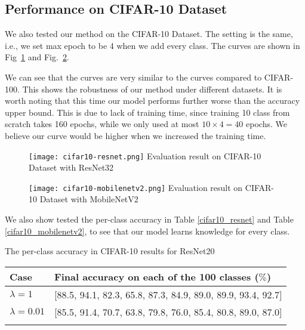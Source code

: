 \subsection{Performance on CIFAR-10 Dataset}
We also tested our method on the CIFAR-10 Dataset. The setting is the same, i.e., we set max epoch to be 4 when we add every class. The curves are shown in Fig~\ref{fig:cifar10-resnet} and Fig.~\ref{fig:cifar10-mobilenetv2}.



We can see that the curves are very similar to the curves compared to CIFAR-100. This shows the robustness of our method under different datasets. It is worth noting that this time our model performs further worse than the accuracy upper bound. This is due to lack of training time, since training 10 class from scratch takes 160 epochs, while we only used at most $10 \times 4 = 40$ epochs. We believe our curve would be higher when we increased the training time.
\begin{figure}[!htp]
	\centering
	\texttt{[image: cifar10-resnet.png]}
	{Evaluation result on CIFAR-10 Dataset with ResNet32}
	\label{fig:cifar10-resnet}
\end{figure}
\begin{figure}[!htp]
	\centering
	\texttt{[image: cifar10-mobilenetv2.png]}
	{Evaluation result on CIFAR-10 Dataset with MobileNetV2}
	\label{fig:cifar10-mobilenetv2}
\end{figure}
We also show tested the per-class accuracy in Table \ref{cifar10_resnet} and Table \ref{cifar10_mobilenetv2}, to see that our model learns knowledge for every class.
\begin{table}[!hpb]
	\centering
	{The per-class accuracy in CIFAR-10 results for ResNet20}
	\label{tab:firstone}
	\begin{tabular}{@{}lp{10cm}@{}} \toprule
		Case &  Final accuracy on each of the 100 classes ($\%$)\\ \midrule
		$\lambda=1$  &[88.5, 94.1, 82.3, 65.8, 87.3, 84.9, 89.0, 89.9, 93.4, 92.7]
		\\
		$\lambda=0.01$  & [85.5, 91.4, 70.7, 63.8, 79.8, 76.0, 85.4, 80.8, 89.0, 87.0]\\ \bottomrule
		\label{tab:cifar10_resnet}
	\end{tabular}
\end{table}

